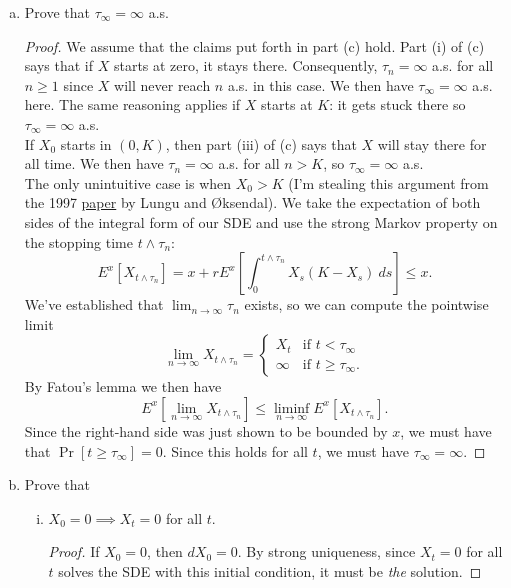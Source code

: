 \documentclass[11pt,letterpaper]{report}
\theoremstyle{definition}
\begin{document}
\begin{enumerate}[(a)]
	\item Prove that $\tau_\infty =\infty$ a.s.
	\begin{proof}
		We assume that the claims put forth in part (c) hold. Part (i) of (c) says that if $X$ starts at zero, it stays there. Consequently, $\tau_n = \infty$ a.s. for all $n\geq 1$ since $X$ will never reach $n$ a.s. in this case. We then have $\tau_\infty = \infty$ a.s. here. The same reasoning applies if $X$ starts at $K$: it gets stuck there so $\tau_\infty = \infty$ a.s.\\

		\noindent If $X_0$ starts in $(0, K)$, then part (iii) of (c) says that $X$ will stay there for all time. We then have $\tau_n = \infty$ a.s. for all $n>K$, so $\tau_\infty = \infty$ a.s.\\

		\noindent The only unintuitive case is when $X_0>K$ (I'm stealing this argument from the 1997 \href{https://reader.elsevier.com/reader/sd/pii/S0025556497000291?token=351C47C91AE312A241ADEE389E279E76737C9DA9ECED317F8963BDBCD3F22534CBC4612DEB95F032348FF7F1641792FA}{paper} by Lungu and \O ksendal). We take the expectation of both sides of the integral form of our SDE and use the strong Markov property on the stopping time $t\land \tau_n$:
		\[
		E^x[X_{t\land \tau_n}] = x + rE^x\left[\int_0^{t\land \tau_n}X_s(K-X_s)\ ds\right]\leq x.
		\]
		We've established that $\lim_{n\to \infty}\tau_n$ exists, so we can compute the pointwise limit
		\[
		\lim_{n\to \infty}X_{t\land \tau_n} = \begin{cases}
			X_t&\text{if }t<\tau_\infty\\
			\infty&\text{if }t\geq \tau_\infty.
		\end{cases}
		\]
		By Fatou's lemma we then have
		\[
		E^x\left[\lim_{n\to \infty}X_{t\land\tau_n}\right] \leq \liminf_{n\to \infty}E^x[X_{t\land \tau_n}].
		\]
		Since the right-hand side was just shown to be bounded by $x$, we must have that $\Pr[t\geq \tau_\infty] = 0$. Since this holds for all $t$, we must have $\tau_\infty = \infty$.
	\end{proof}

	\item Prove that
	\begin{enumerate}[(i)]
		\item $X_0 = 0 \implies X_t = 0$ for all $t$.
		\begin{proof}
			If $X_0 = 0$, then $dX_0 = 0$. By strong uniqueness, since $X_t = 0$ for all $t$ solves the SDE with this initial condition, it must be \textit{the} solution.
		\end{proof}


\end{enumerate}
\end{enumerate}
\end{document}
